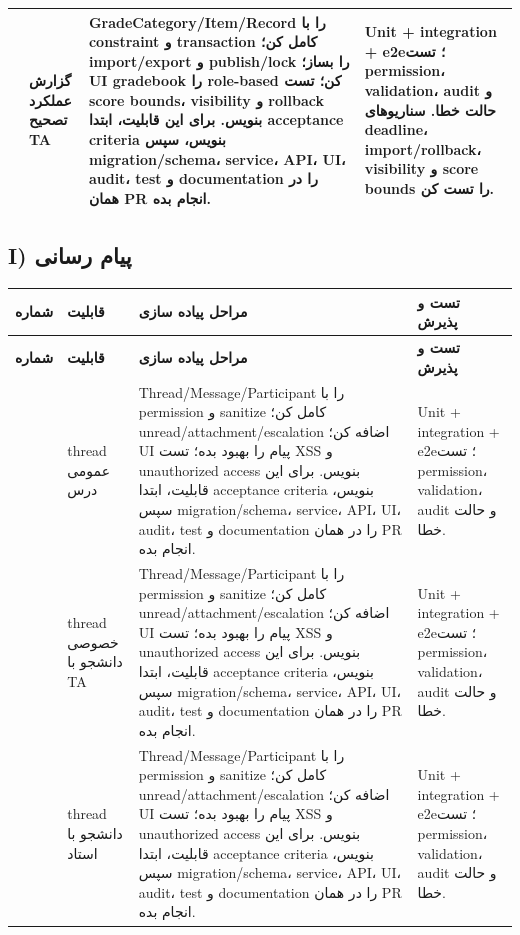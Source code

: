 \documentclass[11pt,a4paper]{article}
\begin{document}
\begin{longtable}{|>{\raggedleft\arraybackslash}p{}|>{\raggedleft\arraybackslash}p{}|>{\raggedleft\arraybackslash}p{}|>{\raggedleft\arraybackslash}p{}|}
140 & گزارش عملکرد تصحیح TA & GradeCategory/Item/Record را با constraint و transaction کامل کن؛ import/export و publish/lock را بساز؛ UI gradebook را role-based کن؛ تست score bounds، visibility و rollback بنویس. برای این قابلیت، ابتدا acceptance criteria بنویس، سپس migration/schema، service، API، UI، audit، test و documentation را در همان PR انجام بده. & Unit + integration + e2e؛ تست permission، validation، audit و حالت خطا. سناریوهای deadline، import/rollback، visibility و score bounds را تست کن. \\ \hline
\end{longtable}
\subsection{I) پیام رسانی}

\begin{longtable}{|>{\raggedleft\arraybackslash}p{}|>{\raggedleft\arraybackslash}p{}|>{\raggedleft\arraybackslash}p{}|>{\raggedleft\arraybackslash}p{}|}
\hline
\textbf{شماره} & \textbf{قابلیت} & \textbf{مراحل پیاده سازی} & \textbf{تست و پذیرش} \\\hline
\endfirsthead
\hline
\textbf{شماره} & \textbf{قابلیت} & \textbf{مراحل پیاده سازی} & \textbf{تست و پذیرش} \\\hline
\endhead
141 & thread عمومی درس & Thread/Message/Participant را با permission و sanitize کامل کن؛ unread/attachment/escalation اضافه کن؛ UI پیام را بهبود بده؛ تست XSS و unauthorized access بنویس. برای این قابلیت، ابتدا acceptance criteria بنویس، سپس migration/schema، service، API، UI، audit، test و documentation را در همان PR انجام بده. & Unit + integration + e2e؛ تست permission، validation، audit و حالت خطا. \\ \hline
142 & thread خصوصی دانشجو با TA & Thread/Message/Participant را با permission و sanitize کامل کن؛ unread/attachment/escalation اضافه کن؛ UI پیام را بهبود بده؛ تست XSS و unauthorized access بنویس. برای این قابلیت، ابتدا acceptance criteria بنویس، سپس migration/schema، service، API، UI، audit، test و documentation را در همان PR انجام بده. & Unit + integration + e2e؛ تست permission، validation، audit و حالت خطا. \\ \hline
143 & thread دانشجو با استاد & Thread/Message/Participant را با permission و sanitize کامل کن؛ unread/attachment/escalation اضافه کن؛ UI پیام را بهبود بده؛ تست XSS و unauthorized access بنویس. برای این قابلیت، ابتدا acceptance criteria بنویس، سپس migration/schema، service، API، UI، audit، test و documentation را در همان PR انجام بده. & Unit + integration + e2e؛ تست permission، validation، audit و حالت خطا. \\ \hline

\end{longtable}
\end{document}
